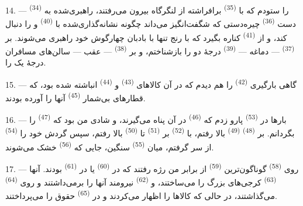 \VUsaut{4.0mm}
\VUsaut{3.0mm}

14. ---  \textsuperscript{(34)} را
ستودم که با  \textsuperscript{(35)} برافراشته از
لنگرگاه بیرون می‌رفتند، راهبری‌شده به دست 
\textsuperscript{(36)} چیره‌دستی که شگفت‌انگیز می‌داند چگونه
 نشانه‌گذاری‌شده با 
\textsuperscript{(40)} و  را دنبال کند، و از
 \textsuperscript{(41)} کناره بگیرد که با رنج تنها با
بادبان چهارگوش خود راهبری می‌شوند. بر 
\textsuperscript{(37)} — دماغه —  \textsuperscript{(39)}
درجهٔ دو را بازشناختم، و بر  \textsuperscript{(38)} —
عقب — سالن‌های مسافران درجهٔ یک را.

15. --- گاهی بارگیری  \textsuperscript{(42)} را هم
دیدم که در آن کالاهای  \textsuperscript{(43)} و
 \textsuperscript{(44)} انباشته شده بود، که
قطارهای بی‌شمار  \textsuperscript{(45)} آنها را
آورده بودند.

\VUsaut{3.0mm}
\VUsaut{3.0mm}

16. --- بارها در  \textsuperscript{(53)} پارو
زدم که  \textsuperscript{(46)} در آن پناه می‌گیرند، و
شادی من بود که  \textsuperscript{(47)} را بگردانم. بر
 \textsuperscript{(48)} 
\textsuperscript{(49)} بالا رفتم، با 
\textsuperscript{(52)} بر  \textsuperscript{(51)} تا
 \textsuperscript{(50)} بالا رفتم، سپس گردش خود را
 \textsuperscript{(54)} از سر گرفتم، میان
 \textsuperscript{(55)} سنگین، جایی که
 \textsuperscript{(56)} خشک می‌شوند.

17. --- روی  \textsuperscript{(58)} گوناگون‌ترین
 \textsuperscript{(59)} از برابر من رژه رفتند که در
 \textsuperscript{(60)} یا در 
\textsuperscript{(61)} بودند. آنها  \textsuperscript{(63)}
کرجی‌های بزرگ را می‌ساختند، و 
\textsuperscript{(62)} نیرومند آنها را برمی‌داشتند و روی
 \textsuperscript{(64)} می‌گذاشتند، در حالی که
 کالاها را اظهار می‌کردند و در 
\textsuperscript{(65)} حقوق را می‌پرداختند.

